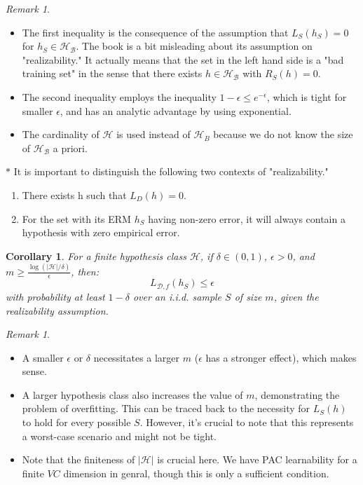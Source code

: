\documentclass{article}
\newtheorem{corollary}[theorem]{Corollary}
\theoremstyle{remark}
\newtheorem{remark}[example]{Remark}
\begin{document}
\begin{remark}
\begin{itemize}
\item The first inequality is the consequence of the assumption that $L_S(h_S)=0$ for $h_S\in \mathcal{H}_\mathcal{B}$. The book is a bit misleading about its assumption on "realizability." It actually means that the set in the left hand side is a "bad training set" in the sense that there exists $h\in \mathcal{H}_\mathcal{B}$ with $R_S(h)=0$.
\item The second inequality employs the inequality $1-\epsilon \leq e^{-\epsilon}$, which is tight for smaller $\epsilon$, and has an analytic advantage by using exponential.
\item The cardinality of $\mathcal{H}$ is used instead of $\mathcal{H}_B$ because we do not know the size of $\mathcal{H_B}$ a priori.
\end{itemize}
\end{remark}

$\ast$ It is important to distinguish the following two contexts of "realizability."
\begin{enumerate}
\item There exists h such that $L_D(h)=0$.
\item For the set with its ERM $h_S$ having non-zero error, it will always contain a hypothesis with zero empirical error.
\end{enumerate}

\begin{corollary}
For a finite hypothesis class $\mathcal{H}$, if $\delta\in (0,1)$, $\epsilon > 0$, and $m \geq \frac{\log(\lvert\mathcal{H}\rvert/\delta)}{\epsilon}$, then:
\[L_{\mathcal{D}, f}(h_S) \leq \epsilon\]
with probability at least $1-\delta$ over an i.i.d. sample $S$ of size $m$, given the realizability assumption.
\end{corollary}

\begin{remark}
\begin{itemize}
\item A smaller $\epsilon$ or $\delta$ necessitates a larger $m$ ($\epsilon$ has a stronger effect), which makes sense.
\item A larger hypothesis class also increases the value of $m$, demonstrating the problem of overfitting. This can be traced back to the necessity for $L_S(h)$ to hold for every possible $S$. However, it's crucial to note that this represents a worst-case scenario and might not be tight.
\item Note that the finiteness of $\lvert \mathcal{H}\rvert$ is crucial here. We have PAC learnability for a finite $VC$ dimension in genral, though this is only a sufficient condition.
\end{itemize}
\end{remark}
\end{document}
